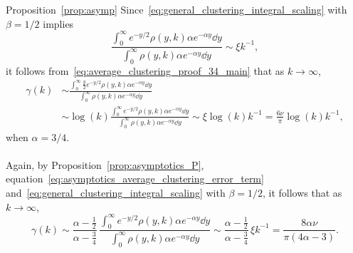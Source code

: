 \begin{proofof}{Proposition~\ref{prop:asymp}}
Since~\eqref{eq:general_clustering_integral_scaling} with $\beta = 1/2$ implies
\[
	\frac{\int_0^\infty e^{-y/2} \rho(y,k) \alpha e^{-\alpha y} \dd y}{\int_0^\infty \rho(y,k) \alpha e^{-\alpha y} \dd y}
	\sim \xi k^{-1},
\]
it follows from~\eqref{eq:average_clustering_proof_34_main} that as $k \to \infty$,
\begin{align*}
	\gamma(k) &\sim \frac{\int_0^\infty \frac{y}{2} e^{-y/2} \rho(y,k) \alpha e^{-\alpha y} \dd y}
		{\int_0^\infty \rho(y,k) \alpha e^{-\alpha y} \dd y} \\
	&\sim \log(k) \frac{\int_0^\infty e^{-y/2} \rho(y,k) \alpha e^{-\alpha y} \dd y}
	{\int_0^\infty \rho(y,k) \alpha e^{-\alpha y} \dd y}
	\sim \xi \log(k)k^{-1} = \frac{6\nu}{\pi} \log(k) k^{-1},
\end{align*}
when $\alpha = 3/4$.

\paragraph{}

Again, by Proposition~\ref{prop:asymptotics_P}, equation~\eqref{eq:asymptotics_average_clustering_error_term} and~\eqref{eq:general_clustering_integral_scaling} with $\beta = 1/2$, it follows that as $k \to \infty$,
\[
	\gamma(k) \sim \frac{\alpha - \frac{1}{2}}{\alpha - \frac{3}{4}} \, \frac{\int_0^{\infty} e^{-y/2} \rho(y,k) \alpha  e^{-\alpha y} \dd y} {\int_0^\infty \rho(y,k) \alpha e^{-\alpha y} \dd y} 
	\sim \frac{\alpha - \frac{1}{2}}{\alpha - \frac{3}{4}} \, \xi k^{-1} = \frac{8\alpha \nu}{\pi(4\alpha - 3)}.
\]
\end{proofof}
